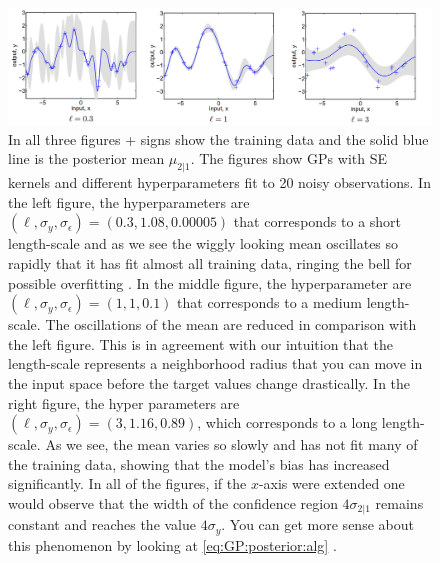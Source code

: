 \documentclass[10pt]{article}
\theoremstyle{definition}
\begin{document}
\begin{figure}[t!]
\centering
\includegraphics[width=17cm]{figs/length-scale.png}
\caption{In all three figures + signs show the training data and the solid blue line is the posterior mean $\mu_{2|1}$. The figures show GPs with SE kernels and different hyperparameters fit to 20 noisy observations. In the left figure, the hyperparameters are $(\ell, \sigma_y, \sigma_{\epsilon})=(0.3, 1.08, 0.00005)$ that corresponds to a short length-scale and as we see the wiggly looking mean oscillates so rapidly that it has fit almost all training data, ringing the bell for possible overfitting . In the middle figure, the hyperparameter are $(\ell, \sigma_y, \sigma_{\epsilon})=(1, 1, 0.1)$ that corresponds to a medium length-scale. The oscillations of the mean are reduced in comparison with the left figure. This is in agreement with our intuition that the length-scale represents a neighborhood radius that you can move in the input space before the target values change drastically. In the right figure, the hyper parameters are  $(\ell, \sigma_y, \sigma_{\epsilon})=(3, 1.16, 0.89)$, which corresponds to a long length-scale. As we see, the mean varies so slowly and has not fit many of the training data, showing that the model's bias has increased significantly. In all of the figures, if the $x$-axis were extended one would observe that the width of the confidence region $4\sigma_{2|1}$ remains constant and reaches the value $4\sigma_y$. You can get more sense about this phenomenon by looking at \cref{eq:GP:posterior:alg} \cite{Rasmussen2006}.}
\label{fig:length:scale}
\end{figure}
\end{document}

